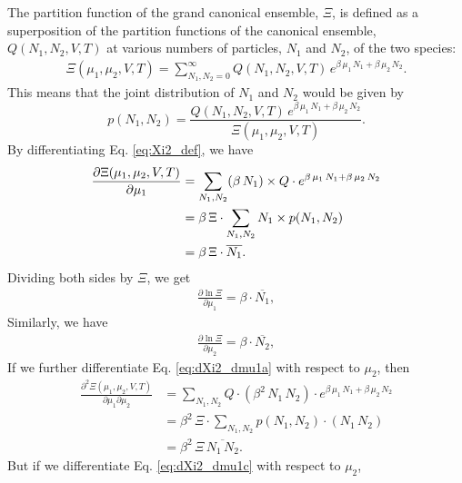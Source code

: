 \documentclass[twocolumn, 10pt]{article}
\numberwithin{equation}{section}
\newenvironment{solution}[1][\empty]
{\par\medskip\sffamily
  \textbf{\ifx\empty#1{Solution.}\relax\else{#1}\fi} \ignorespaces}
{\medskip}
\begin{document}
\begin{solution}
The partition function of the grand canonical ensemble, $\Xi$,
is defined as a superposition of
the partition functions of the canonical ensemble, $Q(N_1, N_2, V, T)$
at various numbers of particles, $N_1$ and $N_2$,
of the two species:
\begin{align}
\Xi(\mu_1, \mu_2, V, T)
=
\sum_{N_1, N_2=0}^\infty
  Q(N_1, N_2, V, T) \,
  e^{\beta \, \mu_1 \, N_1 + \beta \, \mu_2 \, N_2}.
\label{eq:Xi2_def}
\end{align}
%
This means that the joint distribution of $N_1$ and $N_2$
would be given by
$$
p(N_1, N_2) = \frac{ Q(N_1, N_2, V, T) \, e^{\beta \, \mu_1 \, N_1 + \beta \, \mu_2 \, N_2} }
                   { \Xi(\mu_1, \mu_2, V, T) }.
$$
By differentiating Eq. \eqref{eq:Xi2_def},
we have
\begin{align}
  \frac{ \partial \Xi(\mu_1, \mu_2, V, T) }
       { \partial \mu_1 }
  &=
  \sum_{N_1, N_2}
    (\beta \, N_1) \times Q \cdot
    e^{\beta \, \mu_1 \, N_1 + \beta \, \mu_2 \, N_2}
  \label{eq:dXi2_dmu1a}
  \\
  &=
    \beta \, \Xi \cdot
    \sum_{N_1, N_2}
    N_1 \times p(N_1, N_2)
  \notag
  \\
  &=
    \beta \, \Xi \cdot
    \overline{ N_1 }
  .
  \label{eq:dXi2_dmu1c}
\end{align}
%
Dividing both sides by $\Xi$, we get
%
\begin{align*}
  \frac{ \partial \ln \Xi } { \partial \mu_1 }
  = \beta \cdot \overline{ N_1 },
\end{align*}
%
Similarly, we have
\begin{align}
  \frac{ \partial \ln \Xi } { \partial \mu_2 }
  = \beta \cdot \overline{ N_2 },
  \label{eq:dlnXi2_dmu2}
\end{align}
%
If we further differentiate Eq. \eqref{eq:dXi2_dmu1a}
with respect to $\mu_2$, then
\begin{align*}
  \frac{ \partial^2 \Xi(\mu_1, \mu_2, V, T) }
       { \partial \mu_1 \partial \mu_2 }
  &=
  \sum_{N_1, N_2}
    Q \cdot (\beta^2 \, N_1 \, N_2) \cdot
    e^{\beta \, \mu_1 \, N_1 + \beta \, \mu_2 \, N_2}
  \\
  &=
    \beta^2 \, \Xi \cdot
    \sum_{N_1, N_2}
    p(N_1, N_2) \cdot (N_1 \, N_2)
  \\
  &=
  \beta^2 \, \Xi \, \overline{ N_1 \, N_2 }
  .
\end{align*}
%
But if we differentiate Eq. \eqref{eq:dXi2_dmu1c}
with respect to $\mu_2$,
\begin{align*}

\end{align*}
\end{solution}
\end{document}

